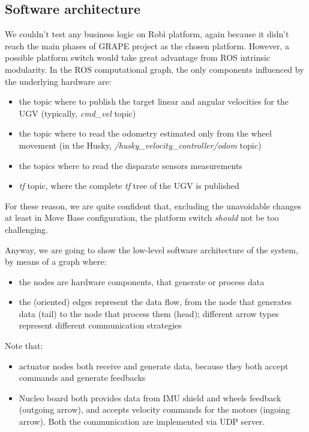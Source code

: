 \subsection{Software architecture}\label{subsec:robiSoftware}
We couldn't test any business logic on Robì platform, again because it didn't reach the main phases of \ac{GRAPE} project as the chosen platform. However, a possible platform switch would take great advantage from \ac{ROS} intrinsic modularity. In the \ac{ROS} computational graph, the only components influenced by the underlying hardware are:
\begin{itemize}
	\item the topic where to publish the target linear and angular velocities for the \ac{UGV} (typically, \textit{cmd\_vel} topic)
	\item the topic where to read the odometry estimated only from the wheel movement (in the Husky, \textit{/husky\_velocity\_controller/odom} topic)
	\item the topics where to read the disparate sensors measurements
	\item \textit{tf} topic, where the complete \textit{tf} tree of the \ac{UGV} is published
\end{itemize}
For these reason, we are quite confident that, excluding the unavoidable changes at least in Move Base configuration, the platform switch \textit{should} not be too challenging.

\par Anyway, we are going to show the low-level software architecture of the system, by means of a graph where:
\begin{itemize}
	\item the nodes are hardware components, that generate or process data
	\item the (oriented) edges represent the data flow, from the node that generates data (tail) to the node that process them (head); different arrow types represent different communication strategies
\end{itemize}
Note that:
\begin{itemize}
	\item  actuator nodes both receive and generate data, because they both accept commands and generate feedbacks
	\item Nucleo board both provides data from \ac{IMU} shield and wheels feedback (outgoing arrow), and accepts velocity commands for the motors (ingoing arrow). Both the communication are implemented via UDP server. 
\end{itemize}


